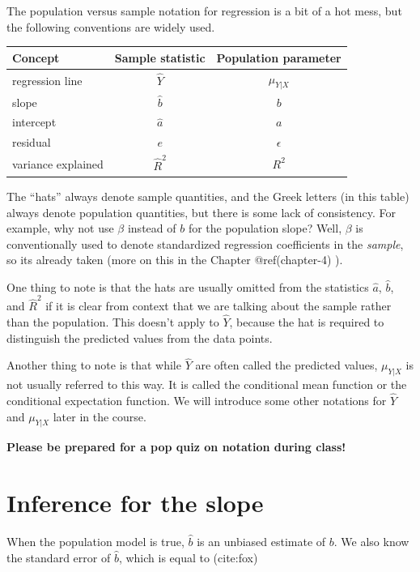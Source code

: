 \documentclass[
  letterpaper,
  DIV=11,
  numbers=noendperiod]{scrreprt}
\begin{document}
The population versus sample notation for regression is a bit of a hot
mess, but the following conventions are widely used.

\begin{longtable}[]{@{}lcc@{}}
\toprule\noalign{}
Concept & Sample statistic & Population parameter \\
\midrule\noalign{}
\endhead
\bottomrule\noalign{}
\endlastfoot
regression line & \(\widehat Y\) & \(\mu_{Y|X}\) \\
slope & \(\widehat b\) & \(b\) \\
intercept & \(\widehat a\) & \(a\) \\
residual & \(e\) & \(\epsilon\) \\
variance explained & \(\widehat R^2\) & \(R^2\) \\
\end{longtable}

The ``hats'' always denote sample quantities, and the Greek letters (in
this table) always denote population quantities, but there is some lack
of consistency. For example, why not use \(\beta\) instead of \(b\) for
the population slope? Well, \(\beta\) is conventionally used to denote
standardized regression coefficients in the \emph{sample}, so its
already taken (more on this in the Chapter @ref(chapter-4) ).

One thing to note is that the hats are usually omitted from the
statistics \(\widehat a\), \(\widehat b\), and \(\widehat R^2\) if it is
clear from context that we are talking about the sample rather than the
population. This doesn't apply to \(\widehat Y\), because the hat is
required to distinguish the predicted values from the data points.

Another thing to note is that while \(\widehat Y\) are often called the
predicted values, \(\mu_{Y|X}\) is not usually referred to this way. It
is called the conditional mean function or the conditional expectation
function. We will introduce some other notations for \(\widehat Y\) and
\(\mu_{Y|X}\) later in the course.

\textbf{Please be prepared for a pop quiz on notation during class!}

\hypertarget{inference-for-slope-2}{%
\section{Inference for the slope}\label{inference-for-slope-2}}

When the population model is true, \(\widehat b\) is an unbiased
estimate of \(b\). We also know the standard error of \(\widehat b\),
which is equal to (cite:fox)
\end{document}
